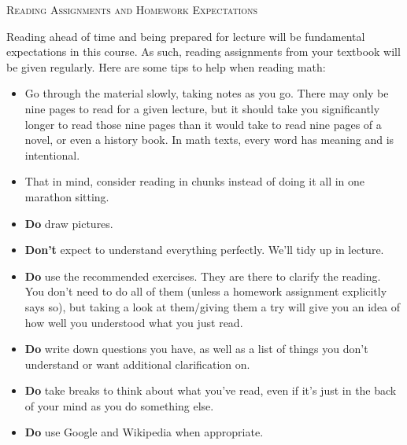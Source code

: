 \documentclass[12pt]{amsbook}
\begin{document}

\SetWatermarkText{
\begin{minipage}[c][8cm]{8cm}
\begin{center}
 
\end{center}
\end{minipage}
}



\begin{center}
   \textsc{\large %
    Reading Assignments and Homework Expectations}\\
\end{center}
\vspace{.5cm}


Reading ahead of time and being prepared for lecture will be fundamental expectations in this course. As such, reading assignments from your textbook will be given regularly. Here are some tips to help when reading math:
\begin{itemize}
\item Go through the material slowly, taking notes as you go. There may only be nine pages to read for a given lecture, but it should take you significantly longer to read those nine pages than it would take to read nine pages of a novel, or even a history book. In math texts, every word has meaning and is intentional.
\item That in mind, consider reading in chunks instead of doing it all in one marathon sitting.
\item \textbf{Do} draw pictures.
\item \textbf{Don't} expect to understand everything perfectly. We'll tidy up in lecture.
\item \textbf{Do} use the recommended exercises. They are there to clarify the reading. You don't need to do all of them (unless a homework assignment explicitly says so), but taking a look at them/giving them a try will give you an idea of how well you understood what you just read.
\item \textbf{Do} write down questions you have, as well as a list of things you don't understand or want additional clarification on.
\item \textbf{Do} take breaks to think about what you've read, even if it's just in the back of your mind as you do something else.
\item \textbf{Do} use Google and Wikipedia when appropriate.
\end{itemize}
\end{document}
